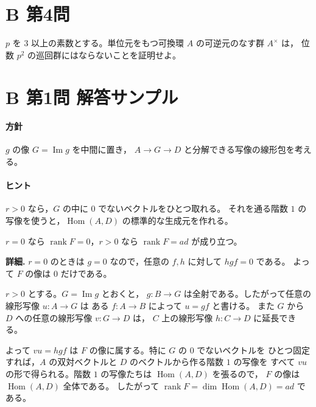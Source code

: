 \documentclass[11pt,a4paper]{ltjsarticle}
\newcommand{\fold}[2]{#1\par\smallskip\noindent\textbf{詳細. }#2\par\smallskip}
\newcommand{\hint}[1]{\paragraph{ヒント}#1}
\newcommand{\strategy}[1]{\paragraph{方針}#1}
\DeclareMathOperator{\Hom}{Hom}
\DeclareMathOperator{\rank}{rank}
\begin{document}
\section*{B 第4問}
\(p\) を \(3\) 以上の素数とする。単位元をもつ可換環 \(A\) の可逆元のなす群 \(A^\times\) は，
位数 \(p^2\) の巡回群にはならないことを証明せよ。

\section*{B 第1問 解答サンプル}
\strategy{
  \(g\) の像 \(G=\operatorname{Im}g\) を中間に置き，
  \(A\to G\to D\) と分解できる写像の線形包を考える。
}

\hint{
  \(r>0\) なら，\(G\) の中に \(0\) でないベクトルをひとつ取れる。
  それを通る階数 \(1\) の写像を使うと，\(\Hom(A,D)\) の標準的な生成元を作れる。
}

\fold{
  \(r=0\) なら \(\rank F=0\)，\(r>0\) なら \(\rank F=ad\) が成り立つ。
}{
  \(r=0\) のときは \(g=0\) なので，任意の \(f,h\) に対して \(hgf=0\) である。
  よって \(F\) の像は \(0\) だけである。

  \(r>0\) とする。\(G=\operatorname{Im}g\) とおくと，
  \(g:B\to G\) は全射である。したがって任意の線形写像 \(u:A\to G\) は
  ある \(f:A\to B\) によって \(u=gf\) と書ける。
  また \(G\) から \(D\) への任意の線形写像 \(v:G\to D\) は，
  \(C\) 上の線形写像 \(h:C\to D\) に延長できる。

  よって \(v u=hgf\) は \(F\) の像に属する。特に \(G\) の \(0\) でないベクトルを
  ひとつ固定すれば，\(A\) の双対ベクトルと \(D\) のベクトルから作る階数 \(1\) の写像を
  すべて \(v u\) の形で得られる。階数 \(1\) の写像たちは \(\Hom(A,D)\) を張るので，
  \(F\) の像は \(\Hom(A,D)\) 全体である。
  したがって \(\rank F=\dim\Hom(A,D)=ad\) である。
}
\end{document}
